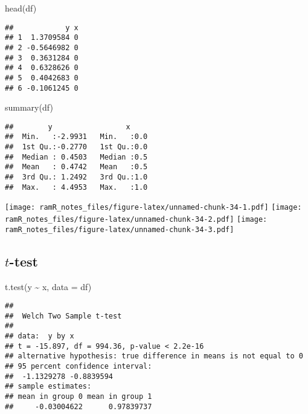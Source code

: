 \documentclass[
]{book}
\newenvironment{Shaded}{\begin{snugshade}}{\end{snugshade}}
\newcommand{\AttributeTok}[1]{\textcolor[rgb]{0.77,0.63,0.00}{#1}}
\newcommand{\FunctionTok}[1]{\textcolor[rgb]{0.00,0.00,0.00}{#1}}
\newcommand{\NormalTok}[1]{#1}
\newcommand{\SpecialCharTok}[1]{\textcolor[rgb]{0.00,0.00,0.00}{#1}}
\theoremstyle{definition}
\theoremstyle{definition}
\theoremstyle{definition}
\theoremstyle{remark}
\begin{document}
\begin{Shaded}
\begin{Highlighting}[]
\FunctionTok{head}\NormalTok{(df)}
\end{Highlighting}
\end{Shaded}

\begin{verbatim}
##            y x
## 1  1.3709584 0
## 2 -0.5646982 0
## 3  0.3631284 0
## 4  0.6328626 0
## 5  0.4042683 0
## 6 -0.1061245 0
\end{verbatim}

\begin{Shaded}
\begin{Highlighting}[]
\FunctionTok{summary}\NormalTok{(df)}
\end{Highlighting}
\end{Shaded}

\begin{verbatim}
##        y                 x      
##  Min.   :-2.9931   Min.   :0.0  
##  1st Qu.:-0.2770   1st Qu.:0.0  
##  Median : 0.4503   Median :0.5  
##  Mean   : 0.4742   Mean   :0.5  
##  3rd Qu.: 1.2492   3rd Qu.:1.0  
##  Max.   : 4.4953   Max.   :1.0
\end{verbatim}

\texttt{[image: ramR\_notes\_files/figure-latex/unnamed-chunk-34-1.pdf]} \texttt{[image: ramR\_notes\_files/figure-latex/unnamed-chunk-34-2.pdf]} \texttt{[image: ramR\_notes\_files/figure-latex/unnamed-chunk-34-3.pdf]}

\hypertarget{t-test}{%
\subsection{\texorpdfstring{\(t\)-test}{t-test}}\label{t-test}}

\begin{Shaded}
\begin{Highlighting}[]
\FunctionTok{t.test}\NormalTok{(y }\SpecialCharTok{\textasciitilde{}}\NormalTok{ x, }\AttributeTok{data =}\NormalTok{ df)}
\end{Highlighting}
\end{Shaded}

\begin{verbatim}
## 
##  Welch Two Sample t-test
## 
## data:  y by x
## t = -15.897, df = 994.36, p-value < 2.2e-16
## alternative hypothesis: true difference in means is not equal to 0
## 95 percent confidence interval:
##  -1.1329278 -0.8839594
## sample estimates:
## mean in group 0 mean in group 1 
##     -0.03004622      0.97839737
\end{verbatim}
\end{document}
